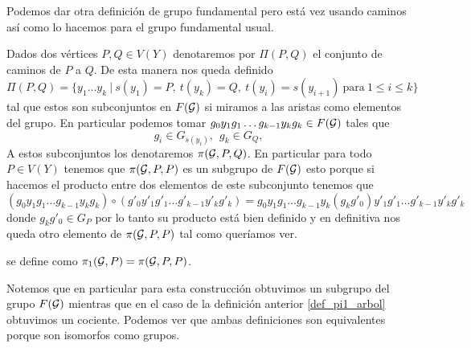 \documentclass[tesis.tex]{subfiles}
\begin{document}
Podemos dar otra definición de grupo fundamental pero está vez usando caminos así como lo hacemos para el grupo fundamental usual.

\medskip
Dados dos vértices $P,Q \in V(Y)$ denotaremos por $\Pi(P,Q)$ el conjunto de caminos de $P$ a $Q$.
De esta manera nos queda definido
\[
\Pi(P,Q) = \{  y_1 \dots y_k \ | \ s(y_1)=P, \ t(y_k) = Q, \ t(y_i) = s(y_{i+1})  \ \text{para} \ 1 \le i \le k \}
\]
tal que estos son subconjuntos en $F({\cal G})$ si miramos a las aristas como elementos del grupo.
En particular podemos tomar $g_0y_1g_1 \dots g_{k-1}y_kg_k \in F({\cal G})$ tales que
\[
g_i \in G_{s(y_i)}, \ \ g_k \in G_Q,
\]
A estos subconjuntos los denotaremos $\pi({\cal G}, P, Q)$. 
En particular para todo $P \in V(Y)$ tenemos que $\pi({\cal G},P,P)$ es un subgrupo de $F({\cal G})$ esto porque si hacemos el producto entre dos elementos de este subconjunto tenemos que
\begin{equation*}
	(g_0y_1g_1 \dots g_{k-1}y_kg_k ) \circ ( g'_0y'_1g'_1 \dots g'_{k-1}y'_kg'_k) =  g_0y_1g_1 \dots g_{k-1}y_k(g_kg'_0)y'_1g'_1 \dots g'_{k-1}y'_kg'_k
\end{equation*}
donde $g_kg'_0 \in G_P$ por lo tanto su producto está bien definido y en definitiva nos queda otro elemento de $\pi({\cal G}, P, P)$ tal como queríamos ver.


\begin{deff}
	 se define como $\pi_1({\cal G}, P) = \pi({\cal G},P,P)$.
\end{deff}

Notemos que en particular para esta construcción obtuvimos un subgrupo del grupo $F(\cal G)$ mientras que en el caso de la definición anterior \ref{def_pi1_arbol} obtuvimos un cociente.
Podemos ver que ambas definiciones son equivalentes porque son isomorfos como grupos.
\end{document}
